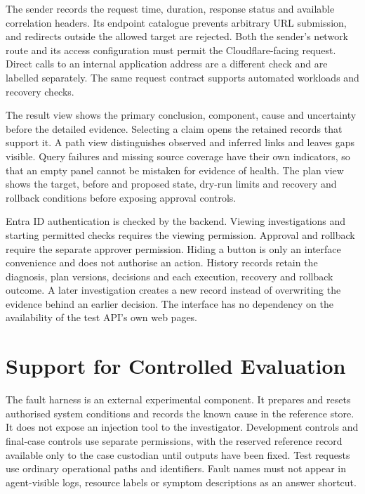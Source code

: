 The sender records the request time, duration, response status and
available correlation headers. Its endpoint catalogue prevents arbitrary
URL submission, and redirects outside the allowed target are rejected.
Both the sender's network route and its access configuration must permit
the Cloudflare-facing request. Direct calls to an internal application
address are a different check and are labelled separately. The same
request contract supports automated workloads and recovery checks.

The result view shows the primary conclusion, component, cause and
uncertainty before the detailed evidence. Selecting a claim opens the
retained records that support it. A path view distinguishes observed and
inferred links and leaves gaps visible. Query failures and missing source
coverage have their own indicators, so that an empty panel cannot be
mistaken for evidence of health. The plan view shows the target, before
and proposed state, dry-run limits and recovery and rollback conditions
before exposing approval controls.

Entra ID authentication is checked by the backend. Viewing investigations
and starting permitted checks requires the viewing permission. Approval
and rollback require the separate approver permission. Hiding a button
is only an interface convenience and does not authorise an action.
History records retain the diagnosis, plan versions, decisions and each
execution, recovery and rollback outcome. A later investigation creates
a new record instead of overwriting the evidence behind an earlier
decision. The interface has no dependency on the availability of the
test API's own web pages.

\section{Support for Controlled Evaluation}
\label{sec:design:evaluation}

The fault harness is an external experimental component. It prepares and
resets authorised system conditions and records the known cause in the
reference store. It does not expose an injection tool to the investigator.
Development controls and final-case controls use separate permissions,
with the reserved reference record available only to the case custodian
until outputs have been fixed. Test requests use ordinary operational
paths and identifiers. Fault names must not appear in agent-visible logs,
resource labels or symptom descriptions as an answer shortcut.

